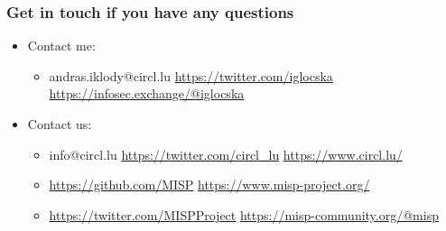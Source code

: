 \begin{frame}
  \frametitle{Get in touch if you have any questions}
  \begin{itemize}
    \item Contact me:
    \begin{itemize}
      \item andras.iklody@circl.lu \url{https://twitter.com/iglocska} \url{https://infosec.exchange/@iglocska}
    \end{itemize}    
    \item Contact us:
    \begin{itemize}
      \item info@circl.lu \url{https://twitter.com/circl_lu} \url{https://www.circl.lu/}
      \item \url{https://github.com/MISP} \url{https://www.misp-project.org/}
      \item \url{https://twitter.com/MISPProject} \url{https://misp-community.org/@misp}
    \end{itemize}
  \end{itemize}
\end{frame}

